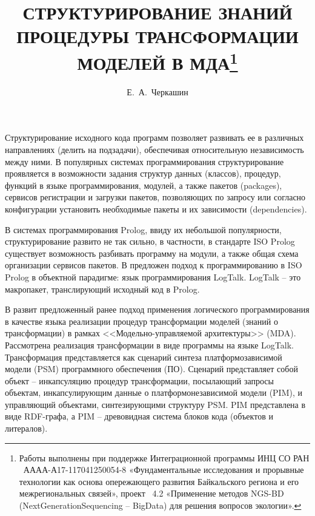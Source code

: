 \documentclass[12pt]{llncs}
\begin{document}
\title{СТРУКТУРИРОВАНИЕ ЗНАНИЙ ПРОЦЕДУРЫ ТРАНСФОРМАЦИИ МОДЕЛЕЙ В МДА\thanks{Работы выполнены при поддержке Интеграционной программы ИНЦ СО РАН \textnumero~АААА-А17-117041250054-8 «Фундаментальные исследования и прорывные технологии как основа  опережающего развития Байкальского региона и его межрегиональных связей», проект \textnumero~4.2 «Применение методов NGS-BD (NextGenerationSequencing – BigData) для решения вопросов экологии».}}

\author{Е.~А.~Черкашин}


\maketitle
Структурирование исходного кода программ позволяет развивать ее в различных направлениях (делить на подзадачи), обеспечивая относительную независимость между ними.  В популярных системах программирования структурирование проявляется в возможности задания структур данных (классов), процедур, функций в языке программирования, модулей, а также пакетов (packages), сервисов регистрации и загрузки пакетов, позволяющих по запросу или согласно конфигурации установить необходимые пакеты и их зависимости (dependencies).

В системах программирования Prolog, ввиду их небольшой популярности, структурирование развито не так сильно, в частности, в стандарте ISO Prolog существует возможность разбивать программу на модули, а также общая схема организации сервисов пакетов. В \cite{logtalk} предложен подход к программированию в ISO Prolog в объектной парадигме: язык программирования LogTalk.  LogTalk -- это макропакет, транслирующий исходный код в Prolog.

В \cite{icist} развит предложенный ранее подход применения логического программирования в качестве языка реализации процедур трансформации моделей (знаний о трансформации) в рамках <<Модельно-управляемой архитектуры>> (MDA).  Рассмотрена реализация трансформации в виде программы на языке LogTalk.  Трансформация представляется как сценарий синтеза платформозависимой модели (PSM) программного обеспечения (ПО).  Сценарий представляет собой объект -- инкапсуляцию процедур трансформации, посылающий запросы объектам, инкапсулирующим данные о платформонезависимой модели (PIM), и управляющий объектами, синтезирующими структуру PSM.  PIM представлена в виде RDF-графа, а PIM -- древовидная система блоков кода (объектов и литералов).
\end{document}
